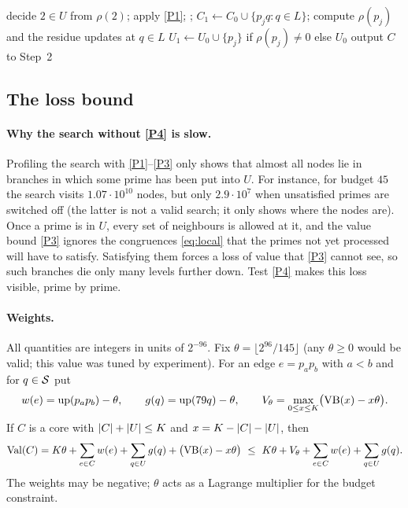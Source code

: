 \documentclass[11pt]{article}
\begin{document}
\begin{algorithm}[t]
\caption{Step 1 (core enumeration), schematically}\label{alg:step1}
\begin{algorithmic}[1]
 
   
     \State decide $2\in U$ from $\rho(2)$; apply \ref{P1}; ; \Return
  \EndIf
   
     \State $C_1\gets C_0\cup\{p_jq:q\in L\}$; compute $\rho(p_j)$ and the residue updates at $q\in L$
     \State $U_1\gets U_0\cup\{p_j\}$ if $\rho(p_j)\ne0$ else $U_0$ 
     \State {}
  \EndFor
\EndProcedure
{}
   output $C$ to Step~2 \EndIf
\EndProcedure
\end{algorithmic}
\end{algorithm}

\subsection{The loss bound}\label{sec:lossbound}

\paragraph{Why the search without \ref{P4} is slow.}
Profiling the search with \ref{P1}--\ref{P3} only shows that almost all nodes lie in branches in which some prime has been put into $U$.
For instance, for budget $45$ the search visits $1.07\cdot10^{10}$ nodes, but only $2.9\cdot10^{7}$ when unsatisfied primes are switched off (the latter is not a valid search; it only shows where the nodes are).
Once a prime is in $U$, every set of neighbours is allowed at it, and the value bound \ref{P3} ignores the congruences \eqref{eq:local} that the primes not yet processed will have to satisfy. Satisfying them forces a loss of value that \ref{P3} cannot see, so such branches die only many levels further down.
Test \ref{P4} makes this loss visible, prime by prime.

\paragraph{Weights.}
All quantities are integers in units of $2^{-96}$. Fix $\theta=\lfloor2^{96}/145\rfloor$ (any $\theta\ge0$ would be valid; this value was tuned by experiment). For an edge $e=p_ap_b$ with $a<b$ and for $q\in\mathcal{S}$ put
\[
w(e)=\operatorname{up}(p_ap_b)-\theta,\qquad g(q)=\operatorname{up}(79q)-\theta,\qquad V_\theta=\max_{0\le x\le K}\bigl(\mathrm{VB}(x)-x\theta\bigr).
\]
If $C$ is a core with $\lvert C\rvert+\lvert U\rvert\le K$ and $x=K-\lvert C\rvert-\lvert U\rvert$, then
\begin{equation}\label{eq:lagrange}
\mathrm{Val}(C)=\budget\theta+\sum_{e\in C}w(e)+\sum_{q\in U}g(q)+\bigl(\mathrm{VB}(x)-x\theta\bigr)\ \le\ \budget\theta+V_\theta+\sum_{e\in C}w(e)+\sum_{q\in U}g(q).
\end{equation}
The weights may be negative; $\theta$ acts as a Lagrange multiplier for the budget constraint.
\end{document}
